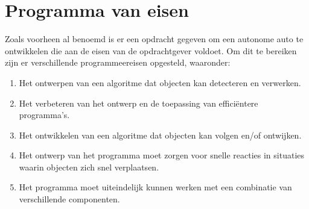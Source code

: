 \section{Programma van eisen}
Zoals voorheen al benoemd is er een opdracht gegeven om een autonome auto te ontwikkelen die aan de eisen van de opdrachtgever voldoet. Om dit te bereiken zijn er verschillende programmeereisen opgesteld, waaronder:

\begin{enumerate}
\item Het ontwerpen van een algoritme dat objecten kan detecteren en verwerken.
\item Het verbeteren van het ontwerp en de toepassing van efficiëntere programma's. \item Het ontwikkelen van een algoritme dat objecten kan volgen en/of ontwijken. \item Het ontwerp van het programma moet zorgen voor snelle reacties in situaties waarin objecten zich snel verplaatsen. \item Het programma moet uiteindelijk kunnen werken met een combinatie van verschillende componenten.
\end{enumerate}